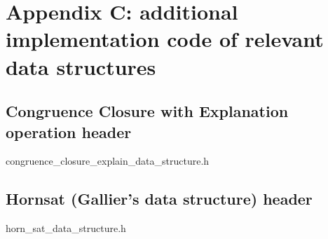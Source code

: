\chapter*{Appendix C: additional implementation 
code of relevant data structures}


\section{Congruence Closure with Explanation operation header}


{congruence_closure_explain_data_structure.h}\label{congruence_closure_label}

\section{Hornsat (Gallier's data structure) header}


{horn_sat_data_structure.h}


